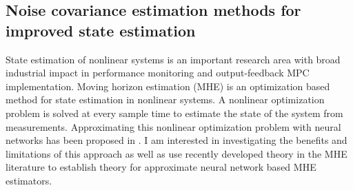\documentclass[11pt, a4paper]{article} %
\begin{document}
\subsection*{Noise covariance estimation methods for improved state estimation}

State estimation of nonlinear systems is an important research area with broad 
industrial impact in performance monitoring and output-feedback MPC 
implementation. Moving horizon estimation (MHE) is an optimization based method 
for state estimation in nonlinear systems. A nonlinear optimization problem is 
solved at every sample time to estimate the state of the system from 
measurements. Approximating this nonlinear optimization problem with neural 
networks has been proposed in . I am interested in investigating the benefits 
and limitations of this approach as well as use recently developed theory in 
the MHE literature to establish theory for approximate neural network based MHE 
estimators.



\end{document}
